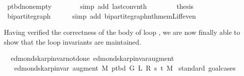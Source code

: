 \begin{isabellebody}
\ p{\isacharunderscore}{\kern0pt}tbd{\isacharunderscore}{\kern0pt}non{\isacharunderscore}{\kern0pt}empty\isanewline
\ \ \ \ \ \ \isamarkupfalse%
\ {\isacharparenleft}{\kern0pt}simp\ add{\isacharcolon}{\kern0pt}\ last{\isacharunderscore}{\kern0pt}conv{\isacharunderscore}{\kern0pt}nth{\isacharparenright}{\kern0pt}\isanewline
\ \ \isamarkupfalse%
\isanewline
\ \ \isamarkupfalse%
\ \isamarkupfalse%
\ {\isacharquery}{\kern0pt}thesis\isanewline
\ \ \ \ \isamarkupfalse%
\ bipartite{\isacharunderscore}{\kern0pt}graph\isanewline
\ \ \ \ \isamarkupfalse%
\ {\isacharparenleft}{\kern0pt}simp\ add{\isacharcolon}{\kern0pt}\ bipartite{\isacharunderscore}{\kern0pt}graph{\isachardot}{\kern0pt}nth{\isacharunderscore}{\kern0pt}mem{\isacharunderscore}{\kern0pt}L{\isacharunderscore}{\kern0pt}iff{\isacharunderscore}{\kern0pt}even{\isacharparenright}{\kern0pt}\isanewline
{}\isamarkupfalse%
%
\endisatagproof
{\isafoldproof}%
%
\isadelimproof
%
\endisadelimproof
%
\begin{isamarkuptext}%
Having verified the correctness of the body of loop , we are now finally
able to show that the loop invariants are maintained.%
\end{isamarkuptext}\isamarkuptrue%
\isamarkupfalse%
\ {\isacharparenleft}{\kern0pt}\ edmonds{\isacharunderscore}{\kern0pt}karp{\isacharunderscore}{\kern0pt}invar{\isacharunderscore}{\kern0pt}not{\isacharunderscore}{\kern0pt}done{\isacharunderscore}{\kern0pt}{}{\isacharparenright}{\kern0pt}\ edmonds{\isacharunderscore}{\kern0pt}karp{\isacharunderscore}{\kern0pt}invar{\isacharunderscore}{\kern0pt}augment{\isacharcolon}{\kern0pt}\isanewline
\ \ \ {\isachardoublequoteopen}edmonds{\isacharunderscore}{\kern0pt}karp{\isacharunderscore}{\kern0pt}invar{\isacharprime}{\kern0pt}{\isacharprime}{\kern0pt}\ {\isacharparenleft}{\kern0pt}augment\ M\ {\isacharparenleft}{\kern0pt}p{\isacharunderscore}{\kern0pt}tbd\ G\ L\ R\ s\ t\ M{\isacharparenright}{\kern0pt}{\isacharparenright}{\kern0pt}{\isachardoublequoteclose}\isanewline
%
\isadelimproof
%
\endisadelimproof
%
\isatagproof
{}\isamarkupfalse%
\ {\isacharparenleft}{\kern0pt}standard{\isacharcomma}{\kern0pt}\ goal{\isacharunderscore}{\kern0pt}cases{\isacharparenright}{\kern0pt}\isanewline
\ \ \isamarkupfalse%
\ {}\isanewline
\ \ \isamarkupfalse%

\end{isabellebody}
